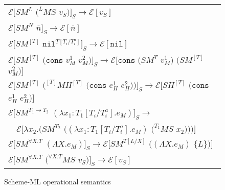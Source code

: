 \begin{figure}[p]
\centering
\begin{tabular}{l}
\vspace{5pt}

$\mathscr{E}[SM^{L}$ $(^{L}MS$ $v_{S})]_{S}\rightarrow\mathscr{E}[v_{S}]$ \\

\vspace{5pt}

$\mathscr{E}[SM^{N}$ $\overline{n}]_{S}\rightarrow\mathscr{E}[\overline{n}]$ \\

\vspace{5pt}

$\mathscr{E}[SM^{[T]}$ $\mathtt{nil}^{T[T_{i}/T_{i}^{a}]}]_{S}\rightarrow\mathscr{E}[\mathtt{nil}]$ \\

\vspace{5pt}

$\mathscr{E}[SM^{[T]}$ $(\mathtt{cons}$ $v_{M}^{1}$ $v_{M}^{2})]_{S}\rightarrow\mathscr{E}[\mathtt{cons}$ $(SM^{T}$ $v_{M}^{1})$ $(SM^{[T]}$ $v_{M}^{2})]$ \\

\vspace{5pt}

$\mathscr{E}[SM^{[T]}$ $(^{[T]}MH^{[T]}$ $(\mathtt{cons}$ $e_{H}^{1}$ $e_{H}^{2}))]_{S}\rightarrow\mathscr{E}[SH^{[T]}$ $(\mathtt{cons}$ $e_{H}^{1}$ $e_{H}^{2})]$ \\

\vspace{5pt}

$\mathscr{E}[SM^{T_{1}\rightarrow T_{2}}$ $(\lambda x_{1}:T_{1}[T_{i}/T_{i}^{a}].e_{M})]_{S}\rightarrow$ \\

\vspace{5pt}

$\quad\mathscr{E}[\lambda x_{2}.(SM^{T_{2}}$ $((\lambda x_{1}:T_{1}[T_{i}/T_{i}^{a}].e_{M})$ $(^{T_{1}}MS$ $x_{2})))]$ \\

\vspace{5pt}

$\mathscr{E}[SM^{\forall X.T}$ $(\Lambda X.e_{M})]_{S}\rightarrow\mathscr{E}[SM^{T[L/X]}$ $((\Lambda X.e_{M})$ $\lbrace L\rbrace)]$ \\

\vspace{5pt}

$\mathscr{E}[SM^{\forall X.T}$ $(^{\forall X.T}MS$ $v_{S})]_{S}\rightarrow\mathscr{E}[v_{S}]$
\end{tabular}
\caption{Scheme-ML operational semantics}
\label{isos}
\end{figure}